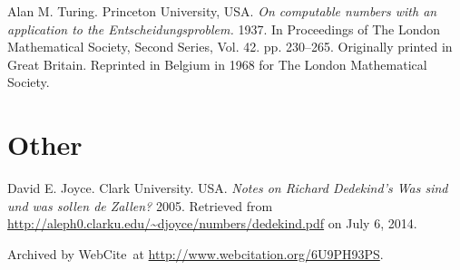 \begin{thebibliography}{9}
Alan M. Turing. Princeton University, USA. \emph{On computable numbers with an
application to the Entscheidungsproblem.} 1937. In Proceedings of The London
Mathematical Society, Second Series, Vol. 42. pp. 230–265. Originally printed
in Great Britain. Reprinted in Belgium in 1968 for The London Mathematical
Society.

\backrefprint







\section*{Other}


David E. Joyce. Clark University. USA. \emph{Notes on Richard Dedekind's Was
sind und was sollen de Zallen?} 2005. Retrieved from
\url{http://aleph0.clarku.edu/~djoyce/numbers/dedekind.pdf} on July 6, 2014.

Archived by WebCite\textsuperscript{\textregistered}\ at
\url{http://www.webcitation.org/6U9PH93PS}.

\backrefprint





\end{thebibliography}
